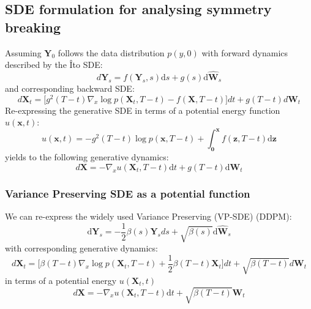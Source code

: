 \subsection{SDE formulation for analysing symmetry breaking}
\label{supp:diffusion_models}
Assuming $\mathbf{Y}_0$ follows the data distribution $p(y,0)$ with forward dynamics described by the Îto SDE:
\begin{equation}
d \mathbf{Y}_s = f(\mathbf{Y}_s, s) \text{d}s +g(s)\text{d}\mathbf{\hat{W}}_s
\end{equation}
 and corresponding backward SDE:
\begin{equation}
d \mathbf{X}_t = \Big[ g^2(T - t) \nabla_x \log p(\mathbf{X}_t, T-t) - f(\mathbf{X}, T-t)\Big]dt +g(T-t)d\mathbf{W}_t
\end{equation}
Re-expressing the generative SDE in terms of a potential energy function $u(\mathbf{x}, t)$:
\begin{equation}
u(\mathbf{x},  t) =  -g^2(T - t) \log  p(\mathbf{x}, T-t)  + \int_{\mathbf{0}}^\mathbf{x} f(\mathbf{z}, T-t) \text{d}\mathbf{z}
\end{equation}
yields to the following generative dynamics:
\begin{equation}
    d \mathbf{X} = -\nabla_x u(\mathbf{X}_t, T- t)\text{d}t  + g(T-t)\text{d}\mathbf{W}_t
\end{equation}

\subsubsection{Variance Preserving SDE as a potential function}
We can re-express the widely used Variance Preserving (VP-SDE) (DDPM):
\begin{equation}
    \text{d} \mathbf{Y}_s = - \frac{1}{2} \beta(s) \mathbf{Y}_s ds + \sqrt{\beta(s)} \text{d}\mathbf{\hat{W}}_s
\end{equation}
with corresponding generative dynamics:
\begin{equation}
d \mathbf{X}_t = \Big[ \beta(T-t)  \nabla_x \log p(\mathbf{X}_t, T-t) + \frac{1}{2} \beta(T-t) \mathbf{X}_t\Big]dt +\sqrt{\beta(T-t)}d\mathbf{W}_t
\end{equation}
in terms of a potential energy $u(\mathbf{X}_t, t)$
\begin{equation}
    d \mathbf{X} = -\nabla_x u(\mathbf{X}_t, T- t)\text{d}t  + \sqrt{\beta(T-t)}\mathbf{W}_t
\end{equation}

